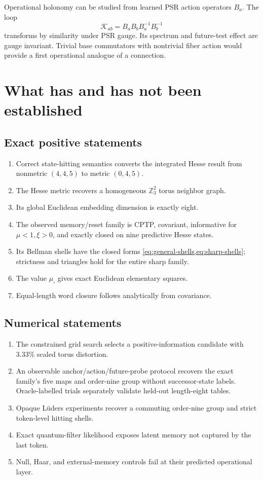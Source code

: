 \documentclass[11pt]{article}
\theoremstyle{definition}
\theoremstyle{remark}
\newcommand{\Z}{\mathbb Z}
\begin{document}
Operational holonomy can be studied from learned PSR action operators
\(B_a\). The loop
\[
\mathcal K_{ab}=B_aB_bB_a^{-1}B_b^{-1}
\]
transforms by similarity under PSR gauge. Its spectrum and future-test effect
are gauge invariant. Trivial base commutators with nontrivial fiber action
would provide a first operational analogue of a connection.

\section{What has and has not been established}

\subsection{Exact positive statements}

\begin{enumerate}
\item Correct state-hitting semantics converts the integrated Hesse result
from nonmetric \((4,4,5)\) to metric \((0,4,5)\).
\item The Hesse metric recovers a homogeneous \(\Z_3^2\) torus neighbor graph.
\item Its global Euclidean embedding dimension is exactly eight.
\item The observed memory/reset family is CPTP, covariant, informative for
\(\mu<1,\xi>0\), and exactly closed on nine predictive Hesse states.
\item Its Bellman shells have the closed forms
\cref{eq:general-shells,eq:sharp-shells}; strictness and triangles hold for
the entire sharp family.
\item The value \(\mu_\square\) gives exact Euclidean elementary squares.
\item Equal-length word closure follows analytically from covariance.
\end{enumerate}

\subsection{Numerical statements}

\begin{enumerate}
\item The constrained grid search selects a positive-information candidate
with \(3.33\%\) scaled torus distortion.
\item An observable anchor/action/future-probe protocol recovers the exact
family's five maps and order-nine group without successor-state labels.
Oracle-labelled trials separately validate held-out length-eight tables.
\item Opaque Lüders experiments recover a commuting order-nine group and
strict token-level hitting shells.
\item Exact quantum-filter likelihood exposes latent memory not captured by
the last token.
\item Null, Haar, and external-memory controls fail at their predicted
operational layer.
\end{enumerate}
\end{document}
